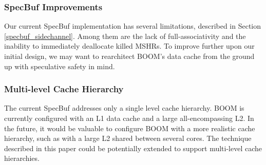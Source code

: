 \subsubsection{SpecBuf Improvements}

Our current SpecBuf implementation has several limitations, described in Section \ref{specbuf_sidechannel}.
Among them are the lack of full-associativity and the inability to immediately deallocate killed MSHRs.
To improve further upon our initial design, we may want to rearchitect BOOM's data cache from
the ground up with speculative safety in mind.

\subsubsection{Multi-level Cache Hierarchy}

The current SpecBuf addresses only a single level cache hierarchy.
BOOM is currently configured with an L1 data cache and a large all-encompassing L2.
In the future, it would be valuable to configure BOOM with a more realistic cache hierarchy,
such as with a large L2 shared between several cores. The technique described in this paper
could be potentially extended to support multi-level cache hierarchies.
